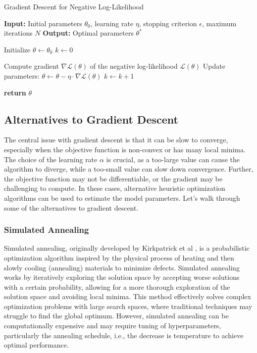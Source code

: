 \documentclass{article}[12pt]
\begin{document}
\begin{algorithm}[H]
\caption{Gradient Descent for Negative Log-Likelihood}
\begin{algorithmic}[1]
\State \textbf{Input:} Initial parameters $\theta_0$, learning rate $\eta$, stopping criterion $\epsilon$, maximum iterations $N$
\State \textbf{Output:} Optimal parameters $\theta^*$

\State Initialize $\theta \gets \theta_0$
\State $k \gets 0$

    \State Compute gradient $\nabla \mathcal{L}(\theta)$ of the negative log-likelihood $\mathcal{L}(\theta)$
    \State Update parameters: $\theta \gets \theta - \eta \cdot \nabla \mathcal{L}(\theta)$
    \State $k \gets k + 1$
\EndWhile

\State \textbf{return} $\theta$
\end{algorithmic}
\end{algorithm}


\subsection{Alternatives to Gradient Descent}
The central issue with gradient descent is that it can be slow to converge, especially when the objective function is non-convex or has many local minima.
The choice of the learning rate $\alpha$ is crucial, as a too-large value can cause the algorithm to diverge, while a too-small value can slow down convergence.
Further, the objective function may not be differentiable, or the gradient may be challenging to compute.
In these cases, alternative heuristic optimization algorithms can be used to estimate the model parameters.
Let's walk through some of the alternatives to gradient descent.

\subsubsection*{Simulated Annealing}
Simulated annealing, originally developed by Kirkpatrick et al \cite{Kirkpatrick:1983aa}, is a probabilistic optimization algorithm inspired by the physical process of 
heating and then slowly cooling (annealing) materials to minimize defects.
Simulated annealing works by iteratively exploring the solution space by accepting worse solutions with a certain probability, allowing for a more thorough exploration of the solution space and avoiding local minima.
This method effectively solves complex optimization problems with large search spaces, where traditional techniques may struggle to find the global optimum.
However, simulated annealing can be computationally expensive and may require tuning of hyperparameters, particularly the annealing schedule, i.e., the decrease is temperature to achieve optimal performance.
\end{document}
